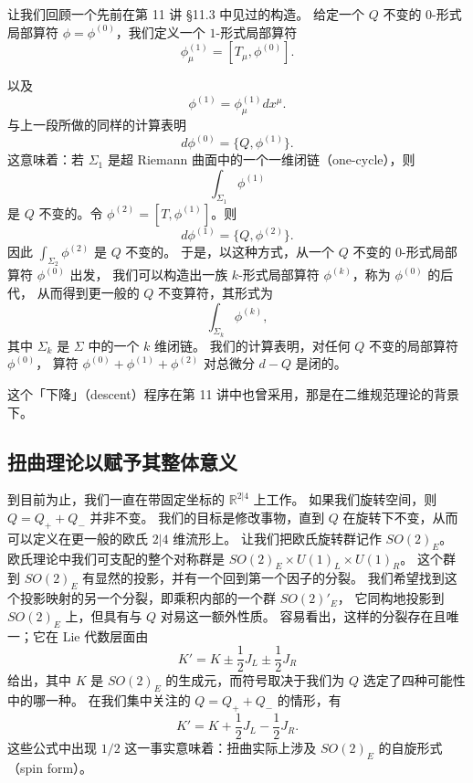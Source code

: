 让我们回顾一个先前在第 11 讲 §11.3 中见过的构造。
给定一个 $Q$ 不变的 $0$-形式局部算符 $\phi=\phi^{(0)}$，我们定义一个 $1$-形式局部算符
\[
\phi^{(1)}_\mu=[T_\mu,\phi^{(0)}].
\]


以及
\[
\phi^{(1)}=\phi^{(1)}_\mu dx^\mu.
\]
与上一段所做的同样的计算表明
\[
d\phi^{(0)}=\{Q,\phi^{(1)}\}.
\]
这意味着：若 $\Sigma_1$ 是超 Riemann 曲面中的一个一维闭链（one-cycle），则
\[
\int_{\Sigma_1}\phi^{(1)}
\]
是 $Q$ 不变的。令 $\phi^{(2)}=[T,\phi^{(1)}]$。则
\[
d\phi^{(1)}=\{Q,\phi^{(2)}\}.
\]
因此 $\int_{\Sigma_2}\phi^{(2)}$ 是 $Q$ 不变的。
于是，以这种方式，从一个 $Q$ 不变的 $0$-形式局部算符 $\phi^{(0)}$ 出发，
我们可以构造出一族 $k$-形式局部算符 $\phi^{(k)}$，称为 $\phi^{(0)}$ 的后代，
从而得到更一般的 $Q$ 不变算符，其形式为
\[
\int_{\Sigma_k}\phi^{(k)},
\]
其中 $\Sigma_k$ 是 $\Sigma$ 中的一个 $k$ 维闭链。
我们的计算表明，对任何 $Q$ 不变的局部算符 $\phi^{(0)}$，
算符 $\phi^{(0)}+\phi^{(1)}+\phi^{(2)}$ 对总微分 $d-Q$ 是闭的。

这个「下降」（descent）程序在第 11 讲中也曾采用，那是在二维规范理论的背景下。

\subsection{扭曲理论以赋予其整体意义}

到目前为止，我们一直在带固定坐标的 $\mathbb{R}^{2|4}$ 上工作。
如果我们旋转空间，则 $Q=Q_++Q_-$ 并非不变。
我们的目标是修改事物，直到 $Q$ 在旋转下不变，从而可以定义在更一般的欧氏 $2|4$ 维流形上。
让我们把欧氏旋转群记作 $SO(2)_E$。
欧氏理论中我们可支配的整个对称群是 $SO(2)_E\times U(1)_L\times U(1)_R$。
这个群到 $SO(2)_E$ 有显然的投影，并有一个回到第一个因子的分裂。
我们希望找到这个投影映射的另一个分裂，即乘积内部的一个群 $SO(2)'_E$，
它同构地投影到 $SO(2)_E$ 上，但具有与 $Q$ 对易这一额外性质。
容易看出，这样的分裂存在且唯一；它在 Lie 代数层面由
\[
K'=K\pm\frac12J_L\pm\frac12J_R
\]
给出，其中 $K$ 是 $SO(2)_E$ 的生成元，而符号取决于我们为 $Q$ 选定了四种可能性中的哪一种。
在我们集中关注的 $Q=Q_++Q_-$ 的情形，有
\[
K'=K+\frac12J_L-\frac12J_R.
\]
这些公式中出现 $1/2$ 这一事实意味着：扭曲实际上涉及 $SO(2)_E$ 的自旋形式（spin form）。

